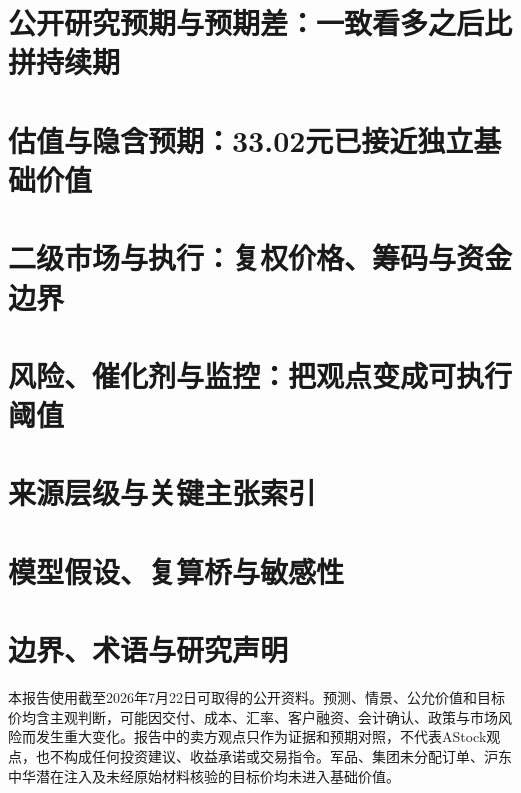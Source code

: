 \documentclass[a4paper,11pt,openany,fontset=none]{ctexrep}
\begin{document}
\chapter{公开研究预期与预期差：一致看多之后比拼持续期}


\chapter{估值与隐含预期：33.02元已接近独立基础价值}


\chapter{二级市场与执行：复权价格、筹码与资金边界}


\chapter{风险、催化剂与监控：把观点变成可执行阈值}


\appendix
\chapter{来源层级与关键主张索引}


\chapter{模型假设、复算桥与敏感性}


\chapter{边界、术语与研究声明}


\clearpage
\thispagestyle{empty}
\vspace*{3.5cm}
\begin{disclosurebox}[重要声明]
\small
本报告使用截至2026年7月22日可取得的公开资料。预测、情景、公允价值和目标价均含主观判断，可能因交付、成本、汇率、客户融资、会计确认、政策与市场风险而发生重大变化。报告中的卖方观点只作为证据和预期对照，不代表AStock观点，也不构成任何投资建议、收益承诺或交易指令。军品、集团未分配订单、沪东中华潜在注入及未经原始材料核验的目标价均未进入基础价值。
\end{disclosurebox}
\end{document}
